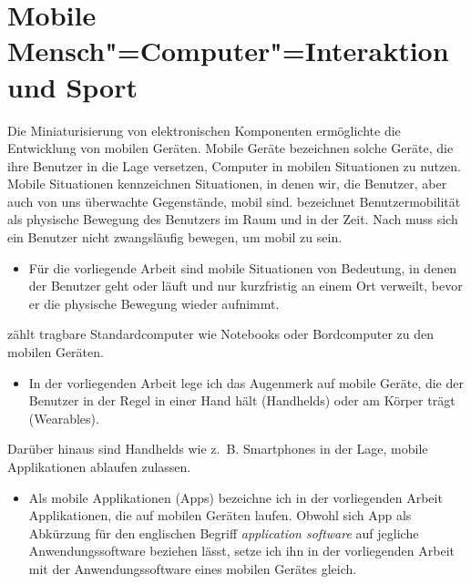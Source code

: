 

\section{Mobile Mensch"=Computer"=Interaktion und Sport} 

\label{sec:mobile_mensch_computer_interaktion_und_sport}

Die Miniaturisierung von elektronischen Komponenten ermöglichte die Entwicklung von mobilen Geräten. Mobile Geräte bezeichnen solche Geräte, die ihre Benutzer in die Lage versetzen, Computer in mobilen Situationen zu nutzen. Mobile Situationen kennzeichnen Situationen, in denen wir, die Benutzer, aber auch von uns überwachte Gegenstände, mobil sind. \citet[][S.~24ff.]{Cooper2002} bezeichnet Benutzermobilität als physische Bewegung des Benutzers im Raum und in der Zeit. Nach \citet[][S.~7]{Roth2005} muss sich ein Benutzer nicht zwangsläufig bewegen, um mobil zu sein. 
\begin{itemize}
	
	\item Für die vorliegende Arbeit sind mobile Situationen von Bedeutung, in denen der Benutzer geht oder läuft und nur kurzfristig an einem Ort verweilt, bevor er die physische Bewegung wieder aufnimmt. 
\end{itemize}

\citet[][S.~5]{Roth2005} zählt tragbare Standardcomputer wie Notebooks oder Bordcomputer zu den mobilen Geräten. 
\begin{itemize}
	
	\item In der vorliegenden Arbeit lege ich das Augenmerk auf mobile Geräte, die der Benutzer in der Regel in einer Hand hält (Handhelds) oder am Körper trägt (Wearables). 
\end{itemize}

Darüber hinaus sind Handhelds wie z.~B. Smartphones in der Lage, mobile Applikationen ablaufen zulassen. 
\begin{itemize}
	
	\item Als mobile Applikationen (Apps) bezeichne ich in der vorliegenden Arbeit Applikationen, die auf mobilen Geräten laufen. Obwohl sich App als Abkürzung für den englischen Begriff \emph{application software} auf jegliche Anwendungssoftware beziehen lässt, setze ich ihn in der vorliegenden Arbeit mit der Anwendungssoftware eines mobilen Gerätes gleich. 
\end{itemize}


